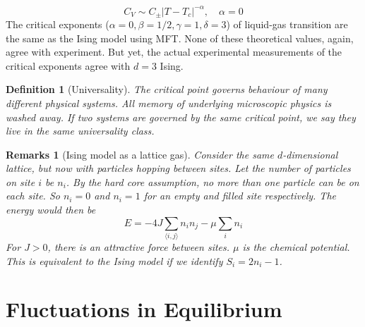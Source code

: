 \documentclass[a4paper]{article}
\newtheorem{remarks}{Remarks}[section]
\theoremstyle{new}
\newtheorem{defi}{Definition}[section]
\begin{document}
$$C_V\sim C_\pm|T-T_c|^{-\alpha},\quad\alpha=0$$
The critical exponents ($\alpha=0,\beta=1/2,\gamma=1,\delta=3$) of liquid-gas transition are the same as the Ising model using MFT. None of these theoretical values, again, agree with experiment. But yet, the actual experimental measurements of the critical exponents agree with $d=3$ Ising.
\begin{defi}[Universality]
The critical point governs behaviour of many different physical systems. All memory of underlying microscopic physics is washed away. If two systems are governed by the same critical point, we say they live in the same universality class.
\end{defi}
\begin{remarks}[Ising model as a lattice gas]
Consider the same $d$-dimensional lattice, but now with particles hopping between sites. Let the number of particles on site $i$ be $n_i$. By the hard core assumption, no more than one particle can be on each site. So $n_i=0$ and $n_i=1$ for an empty and filled site respectively. The energy would then be
$$E=-4J\sum_{\langle i,j\rangle}n_in_j-\mu\sum_in_i$$
For $J>0$, there is an attractive force between sites. $\mu$ is the chemical potential. This is equivalent to the Ising model if we identify $S_i=2n_i-1$.
\end{remarks}


\newpage
\section{Fluctuations in Equilibrium}
\end{document}
